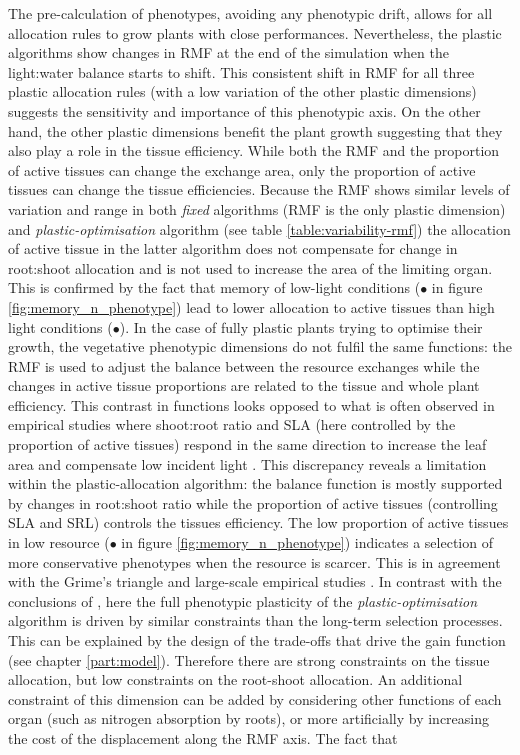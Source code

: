 The pre-calculation of phenotypes, avoiding any phenotypic drift, allows for all allocation rules to grow plants with close performances. Nevertheless, the plastic algorithms show changes in RMF at the end of the simulation when the light:water balance starts to shift. This consistent shift in RMF for all three plastic allocation rules (with a low variation of the other plastic dimensions) suggests the sensitivity and importance of this phenotypic axis. On the other hand, the other plastic dimensions benefit the plant growth suggesting that they also play a role in the tissue efficiency. While both the RMF and the proportion of active tissues can change the exchange area, only the proportion of active tissues can change the tissue efficiencies. Because the RMF shows similar levels of variation and range in both \textit{fixed} algorithms (RMF is the only plastic dimension) and \textit{plastic-optimisation} algorithm (see table \ref{table:variability-rmf}) the allocation of active tissue in the latter algorithm does not compensate for change in root:shoot allocation and is not used to increase the area of the limiting organ. This is confirmed by the fact that memory of low-light conditions (\textcolor{myBlue}{$\bullet$} in figure \ref{fig:memory_n_phenotype}) lead to lower allocation to active tissues than high light conditions (\textcolor{myYellow}{$\bullet$}). In the case of fully plastic plants trying to optimise their growth, the vegetative phenotypic dimensions do not fulfil the same functions: the RMF is used to adjust the balance between the resource exchanges while the changes in active tissue proportions are related to the tissue and whole plant efficiency. This contrast in functions looks opposed to what is often observed in empirical studies where shoot:root ratio and SLA (here controlled by the proportion of active tissues) respond in the same direction to increase the leaf area and compensate low incident light \parencite{ryser_consequences_2000, poorter_causes_2009, poorter_biomass_2012}. This discrepancy reveals a limitation within the plastic-allocation algorithm: the balance function is mostly supported by changes in root:shoot ratio while the proportion of active tissues (controlling SLA and SRL) controls the tissues efficiency. The low proportion of active tissues in low resource (\textcolor{myRed}{$\bullet$} in figure \ref{fig:memory_n_phenotype}) indicates a selection of more conservative phenotypes when the resource is scarcer. This is in agreement with the Grime's triangle \parencite{grime_evidence_1977} and large-scale empirical studies \parencite{wright_worldwide_2004}. In contrast with the conclusions of \citet{ryser_consequences_2000}, here the full phenotypic plasticity of the \textit{plastic-optimisation} algorithm is driven by similar constraints than the long-term selection processes. This can be explained by the design of the trade-offs that drive the gain function (see chapter \ref{part:model}). Therefore there are strong constraints on the tissue allocation, but low constraints on the root-shoot allocation. An additional constraint of this dimension can be added by considering other functions of each organ (such as nitrogen absorption by roots), or more artificially by increasing the cost of the displacement along the RMF axis. The fact that 